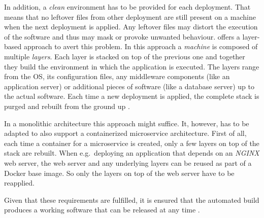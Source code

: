 In addition, a \textit{clean} environment has to be provided for each
deployment. That means that no leftover files from other deployment are still
present on a machine when the next deployment is applied. Any leftover files
may distort the execution of the software and thus may mask or provoke unwanted
behaviour. \autocite{ArtacDevOpsIntroducingInfrastructure2017} offers a
layer-based approach to avert this problem. In this approach a \textit{machine}
is composed of multiple \textit{layers}. Each layer is stacked on top of the
previous one and together they build the environment in which the application
is executed. The layers range from the \ac{OS}, its configuration files, any
middleware components (like an application server) or additional pieces of
software (like a database server) up to the actual software. Each time a new
deployment is applied, the complete stack is purged and rebuilt from the ground
up \autocite[p. 194]{MatyasContinuousIntegration2007}.

In a monolithic architecture this approach might suffice. It, however, has to
be adapted to also support a containerized microservice architecture. First of
all, each time a container for a microservice is created, only a few layers on
top of the stack are rebuilt. When e.g.\ deploying an application that depends
on an \textit{NGINX} web server, the web server and any underlying layers can
be reused as part of a Docker base image. So only the layers on top of the web
server have to be reapplied.

Given that these requirements are fulfilled, it is ensured that the automated
build produces a working software that can be released at any time \autocite[p.
200]{MatyasContinuousIntegration2007}.
